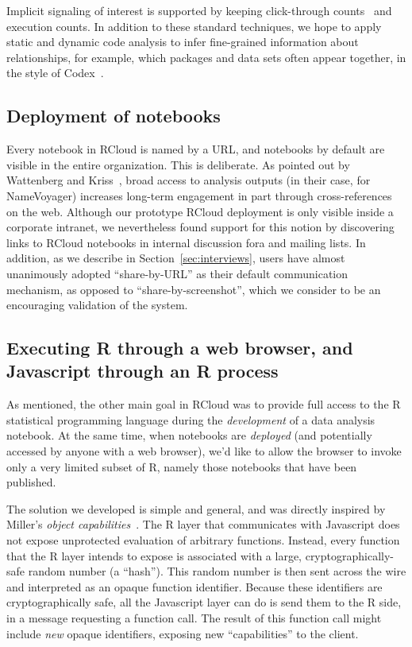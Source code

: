 Implicit signaling of interest is supported by keeping click-through
counts~\cite{Joachims:2005:AIC} and execution counts. In addition to
these standard techniques, we hope to apply static and dynamic code
analysis to infer fine-grained information about relationships,
for example, which packages and data sets often appear together,
in the style of Codex~\cite{Fast:2014:ECS}.

\subsection{Deployment of notebooks\label{sec:deployment}}

Every notebook in RCloud is named by a URL, and notebooks by default
are visible in the entire organization. This is deliberate.
As pointed out by Wattenberg and Kriss~\cite{Wattenberg:2011:DFS},
broad access to analysis outputs (in their case, for NameVoyager) increases
long-term engagement in part through cross-references on the
web. Although our prototype RCloud deployment is only visible inside a
corporate intranet, we nevertheless found support for this notion by
discovering links to RCloud notebooks in internal discussion fora and
mailing lists. In addition, as we describe in
Section~\ref{sec:interviews}, users have almost unanimously adopted
``share-by-URL'' as their default communication mechanism, as opposed
to ``share-by-screenshot'', which we consider to be an encouraging
validation of the system.

\subsection{Executing R through a web browser, and Javascript through an R process\label{sec:Rinbrowser}}

As mentioned, the other main goal in RCloud was to provide
full access to the R statistical programming language during the
\emph{development} of a data analysis notebook.
At the same time, when notebooks are \emph{deployed} (and potentially
accessed by anyone with a web browser), we'd like to allow the
browser to invoke only a very limited subset of R, namely those
notebooks that have been published.

The solution we developed is simple and general, and was directly
inspired by Miller's \emph{object
  capabilities}~\cite{Miller:2006:RCT}. The R layer that
communicates with Javascript does not expose unprotected evaluation of
arbitrary functions. Instead, every function that the R layer intends
to expose is associated with a large, cryptographically-safe random
number (a ``hash''). This random number is then sent
across the wire and interpreted as an opaque function identifier.
Because these identifiers are cryptographically safe, all
the Javascript layer can do is send them to the R side, in a
message requesting a function call. 
The result of this function call might include \emph{new}
opaque identifiers, exposing new ``capabilities'' to the client.

